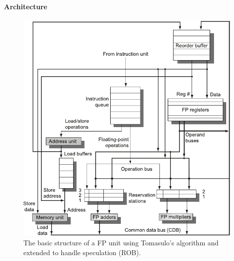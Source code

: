 \paragraph{Architecture}

\begin{figure}[!htp]
    \centering
    \includegraphics[width=\textwidth]{img/tomasulo-fpu-rob.pdf}
    \caption{The basic structure of a FP unit using Tomasulo's algorithm and extended to handle speculation (ROB).\cite{hennessy2017computer}}
\end{figure}

